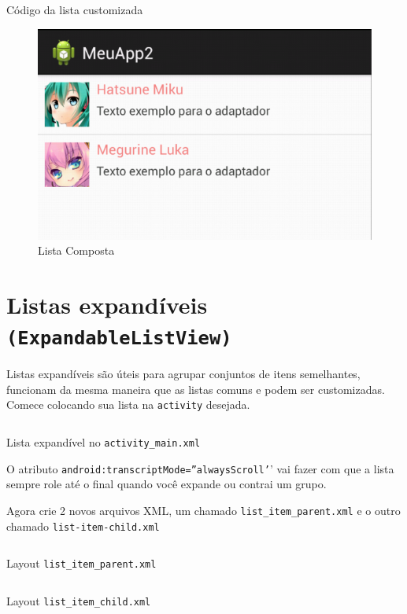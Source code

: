 \documentclass[a4paper,12pt,brazil,doubleside]{book}
\begin{document}
\begin{singlespace}
\begin{listing}[H]
\inputminted[linenos=true,fontsize=\small,frame=lines, framesep=2mm, tabsize=2,numbersep=5pt]{java}{src/design/customlist.java}
\caption{Código da lista customizada}
\end{listing}	

\begin{figure}[H]
  \centering
  \includegraphics[width=.475\textwidth]{figuras/design/lista-composta.png}
  \caption{Lista Composta}
  \label{fig:e}
\end{figure}

\section{Listas expandíveis \texttt{(ExpandableListView)}}

Listas expandíveis são úteis para agrupar conjuntos de itens semelhantes, funcionam da mesma maneira que as listas comuns e podem ser customizadas.
Comece colocando sua lista na \texttt{activity} desejada.
	
\begin{listing}[H]
\inputminted[linenos=true,fontsize=\small,frame=lines, framesep=2mm, tabsize=2,numbersep=5pt]{xml}{src/design/exlist.xml}
\caption{Lista expandível no \texttt{activity\_main.xml}}
\end{listing}	

O atributo \texttt{android:transcriptMode=''alwaysScroll'}' vai fazer com que a lista sempre role até o final quando você expande ou contrai um grupo.
 
Agora crie 2 novos arquivos XML, um chamado \texttt{list\_item\_parent.xml} e o outro chamado \texttt{list-item-child.xml}

\begin{listing}[H]
\inputminted[linenos=true,fontsize=\small,frame=lines, framesep=2mm, tabsize=2,numbersep=5pt]{xml}{src/design/list-item-parent.xml}
\caption{Layout \texttt{list\_item\_parent.xml}}
\end{listing}	

\begin{listing}[H]
\inputminted[linenos=true,fontsize=\small,frame=lines, framesep=2mm, tabsize=2,numbersep=5pt]{xml}{src/design/list-item-child.xml}
\caption{Layout \texttt{list\_item\_child.xml}}
\end{listing}	


\end{singlespace}
\end{document}
